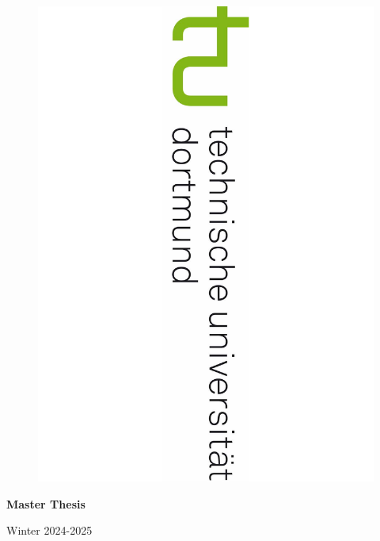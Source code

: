 \documentclass[12pt,a4paper]{article}
\numberwithin{equation}{section}
\begin{document}
\begin{titlepage}
\begin{figure}[!htp]
     \hspace*{-1.1cm}
 \begin{minipage}[r][0.22\paperwidth][l]{0.2\paperwidth}
\includegraphics[scale = 0.25,angle=90]{TULogo.pdf}    %
\end{minipage} \hspace{21cm}
   \end{figure}


\thispagestyle{empty}
  \sffamily

\begin{center}
   \begin{Huge}
   \textbf{Master Thesis} \\
   \end{Huge}
   \begin{large}
  Winter 2024-2025\\
\end{large}


\end{center}
\end{titlepage}
\end{document}
